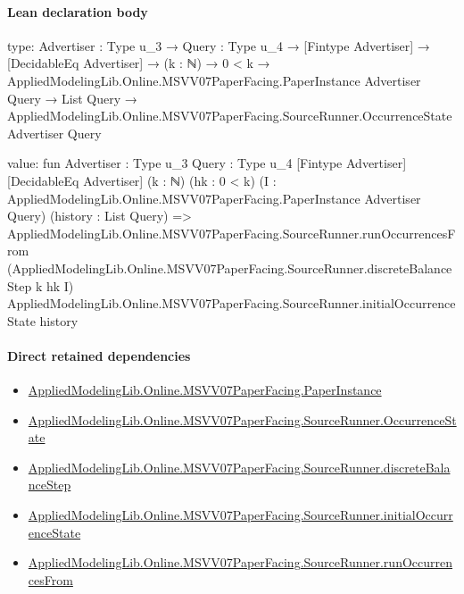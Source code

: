 \documentclass[10pt]{article}
\begin{document}
\paragraph{Lean declaration body}
\begin{ReviewVerbatim}
type:
{Advertiser : Type u_3} →
  {Query : Type u_4} →
    [Fintype Advertiser] →
      [DecidableEq Advertiser] →
        (k : ℕ) →
          0 < k →
            AppliedModelingLib.Online.MSVV07PaperFacing.PaperInstance Advertiser Query →
              List Query → AppliedModelingLib.Online.MSVV07PaperFacing.SourceRunner.OccurrenceState Advertiser Query

value:
fun {Advertiser : Type u_3} {Query : Type u_4} [Fintype Advertiser] [DecidableEq Advertiser] (k : ℕ) (hk : 0 < k)
    (I : AppliedModelingLib.Online.MSVV07PaperFacing.PaperInstance Advertiser Query) (history : List Query) =>
  AppliedModelingLib.Online.MSVV07PaperFacing.SourceRunner.runOccurrencesFrom
    (AppliedModelingLib.Online.MSVV07PaperFacing.SourceRunner.discreteBalanceStep k hk I)
    AppliedModelingLib.Online.MSVV07PaperFacing.SourceRunner.initialOccurrenceState history
\end{ReviewVerbatim}

\paragraph{Direct retained dependencies}
\begin{itemize}\raggedright
\item \hyperlink{governing-declaration-11907576ec71eeb5}{Applied\allowbreak{}Modeling\allowbreak{}Lib.\allowbreak{}Online.\allowbreak{}MSVV07\allowbreak{}Paper\allowbreak{}Facing.\allowbreak{}Paper\allowbreak{}Instance}
\item \hyperlink{governing-declaration-2eff7815f49c1d41}{Applied\allowbreak{}Modeling\allowbreak{}Lib.\allowbreak{}Online.\allowbreak{}MSVV07\allowbreak{}Paper\allowbreak{}Facing.\allowbreak{}Source\allowbreak{}Runner.\allowbreak{}Occurrence\allowbreak{}State}
\item \hyperlink{governing-declaration-bb4368c1f7124ea1}{Applied\allowbreak{}Modeling\allowbreak{}Lib.\allowbreak{}Online.\allowbreak{}MSVV07\allowbreak{}Paper\allowbreak{}Facing.\allowbreak{}Source\allowbreak{}Runner.\allowbreak{}discrete\allowbreak{}Balance\allowbreak{}Step}
\item \hyperlink{governing-declaration-e173eeda3926c5ec}{Applied\allowbreak{}Modeling\allowbreak{}Lib.\allowbreak{}Online.\allowbreak{}MSVV07\allowbreak{}Paper\allowbreak{}Facing.\allowbreak{}Source\allowbreak{}Runner.\allowbreak{}initial\allowbreak{}Occurrence\allowbreak{}State}
\item \hyperlink{governing-declaration-7f435ae50ae781b1}{Applied\allowbreak{}Modeling\allowbreak{}Lib.\allowbreak{}Online.\allowbreak{}MSVV07\allowbreak{}Paper\allowbreak{}Facing.\allowbreak{}Source\allowbreak{}Runner.\allowbreak{}run\allowbreak{}Occurrences\allowbreak{}From}
\end{itemize}
\hypertarget{governing-declaration-e77776076e3ea49e}{}
\end{document}
